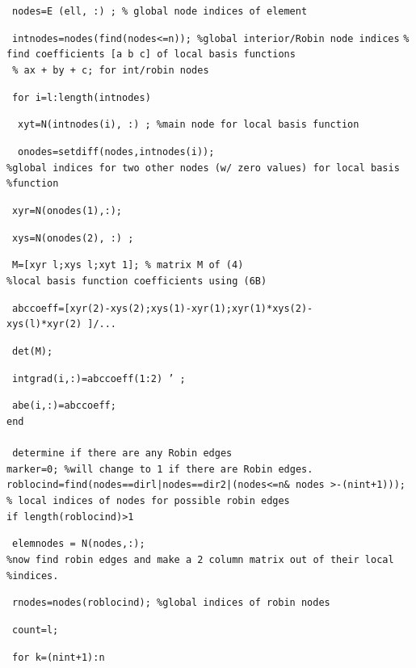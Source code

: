\documentclass[../main.tex]{subfiles}
\begin{document}
~\texttt{nodes=E (ell, :) ; \% global node indices of element}

~\texttt{intnodes=nodes(find(nodes<=n)); \%global interior/Robin node indices}
\texttt{\% find coefficients [a b c] of local basis functions }\\
\texttt{ \% ax + by + c; for int/robin nodes 
}

~\texttt{for i=l:length(intnodes) }

~~\texttt{xyt=N(intnodes(i), :) ; \%main node for local basis function }

~~\texttt{onodes=setdiff(nodes,intnodes(i));}\\
\texttt{\%global indices for two other nodes (w/ zero values) for local basis}\\
\texttt{\%function}

~\texttt{xyr=N(onodes(1),:); }

~\texttt{xys=N(onodes(2), :) ;}

~\texttt{M=[xyr l;xys l;xyt 1]; \% matrix M of (4)}\\
\texttt{\%local basis function coefficients using (6B)}

~\texttt{abccoeff=[xyr(2)-xys(2);xys(1)-xyr(1);xyr(1)*xys(2)-}\\
\texttt{xys(l)*xyr(2) ]/...}

~\texttt{det(M);}

~\texttt{intgrad(i,:)=abccoeff(1:2) ' ;}

~\texttt{abe(i,:)=abccoeff;}\\
\texttt{end}
\\
\\
\texttt{ determine if there are any Robin edges}\\
\texttt{marker=0; \%will change to 1 if there are Robin edges.}\\
\texttt{roblocind=find(nodes==dirl|nodes==dir2|(nodes<=n\& nodes >-(nint+1)));}\\
\texttt{\% local indices of nodes for possible robin edges}\\
\texttt{if length(roblocind)>1 
}

~\texttt{elemnodes = N(nodes,:); 
}\\
\texttt{\%now find robin edges and make a 2 column matrix out of their local}\\
\texttt{\%indices. }

~\texttt{rnodes=nodes(roblocind); \%global indices of robin nodes}

~\texttt{count=l;}

~\texttt{for k=(nint+1):n}
\end{document}
